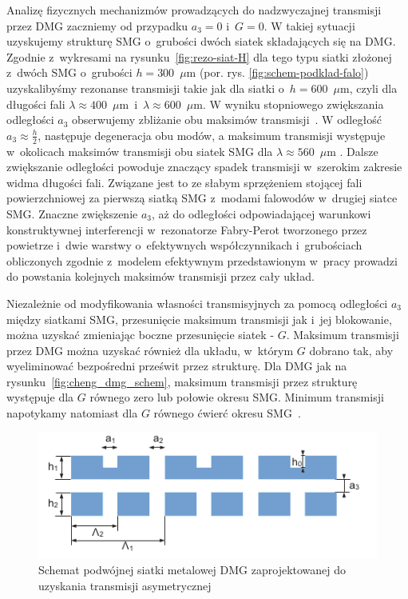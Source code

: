 Analizę fizycznych mechanizmów prowadzących do nadzwyczajnej transmisji przez DMG zaczniemy od przypadku $a_3=0$ i~$G=0$. W takiej sytuacji uzyskujemy strukturę SMG o~grubości dwóch siatek składających się na DMG. Zgodnie z~wykresami na rysunku~\ref{fig:rezo-siat-H} dla tego typu siatki złożonej z~dwóch SMG o~grubości $h=300$~$\mu$m (por. rys. \ref{fig:schem-podklad-falo}) uzyskalibyśmy rezonanse transmisji takie jak dla siatki o~$h=600$~$\mu$m, czyli dla długości fali $\lambda \approx 400$~$\mu$m~i~$\lambda \approx 600$~$\mu$m. W wyniku stopniowego zwiększania odległości $a_3$ obserwujemy zbliżanie obu maksimów transmisji~\cite{cheng2008physical}. W odległość $a_3 \approx \frac{h}{2}$, następuje degeneracja obu modów, a maksimum transmisji występuje w~okolicach maksimów transmisji obu siatek SMG dla $\lambda \approx 560$~$\mu$m \cite{cheng2008physical}. Dalsze zwiększanie odległości powoduje znaczący spadek transmisji w~szerokim zakresie widma długości fali. Związane jest to ze słabym sprzężeniem stojącej fali powierzchniowej za pierwszą siatką SMG z~modami falowodów w~drugiej siatce SMG. Znaczne zwiększenie $a_3$, aż do odległości odpowiadającej warunkowi konstruktywnej interferencji w~rezonatorze Fabry-Perot tworzonego przez powietrze i~dwie warstwy o~efektywnych współczynnikach i~grubościach obliczonych zgodnie z~modelem efektywnym przedstawionym w~pracy \cite{shen2005mechanism} prowadzi do powstania kolejnych maksimów transmisji przez cały układ.

Niezależnie od modyfikowania własności transmisyjnych za pomocą odległości $a_3$ między siatkami SMG, przesunięcie maksimum transmisji jak i~jej blokowanie, można uzyskać zmieniając boczne przesunięcie siatek - $G$. Maksimum transmisji przez DMG można uzyskać również dla układu, w~którym $G$ dobrano tak, aby wyeliminować bezpośredni prześwit przez strukturę. Dla DMG jak na rysunku~\ref{fig:cheng_dmg_schem}, maksimum transmisji przez strukturę występuje dla $G$ równego zero lub połowie okresu SMG. Minimum transmisji napotykamy natomiast dla $G$ równego ćwierć okresu SMG~\cite{chan2006optical}.

\begin{figure}[tb]
	\includegraphics[width=\textwidth]{images/thz/1D-DMG-schemat.png}
	\caption{Schemat podwójnej siatki metalowej DMG zaprojektowanej do uzyskania transmisji asymetrycznej}
	\label{fig:1ddmg-schem}
\end{figure}


